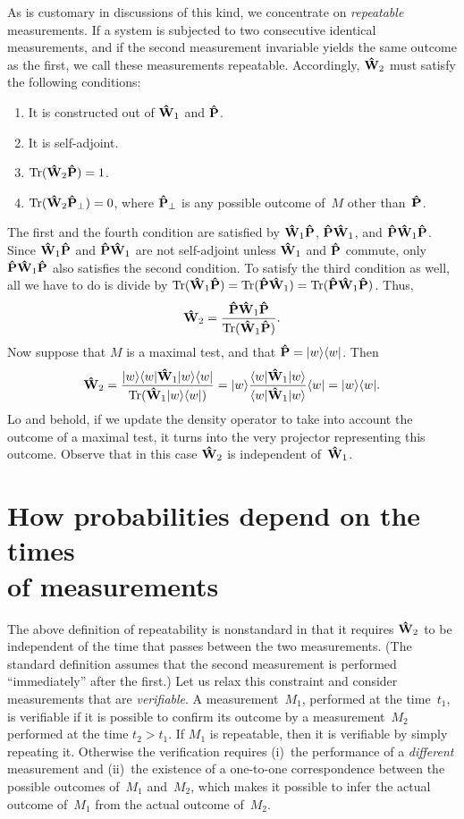 \documentclass[12pt]{article}
\newcommand{\bra}[1]{\langle#1\vert}
\newcommand{\ket}[1]{\vert#1\rangle}
\newcommand{\ketbra}[2]{\vert#1\rangle\langle#2\vert}
\newcommand{\sandwich}[3]{\langle#1\vert#2\vert#3\rangle}
\newcommand{\Tr}{\hbox{Tr}}
\newcommand{\be}{\begin{equation}}
\newcommand{\ee}{\end{equation}}
\newcommand{\ben}{\begin{enumerate}}
\newcommand{\een}{\end{enumerate}}
\newcommand{\hP}{{\bf\hat P}}
\newcommand{\hW}{{\bf\hat W}}
\begin{document}
As is customary in discussions of this kind, we concentrate on \textit{repeatable} measurements. If a system is subjected to two consecutive identical measurements, and if the second measurement invariable yields the same outcome as the first, we call these measurements repeatable. Accordingly, $\hW_2$ must satisfy the following conditions:
\ben
\item It is constructed out of $\hW_1$ and $\hP$.
\item It is self-adjoint.
\item $\Tr(\hW_2\hP)=1$.
\item $\Tr(\hW_2\hP_\perp)=0$, where $\hP_\perp$ is any possible outcome of~$M$ other than~$\hP$.
\een
The first and the fourth condition are satisfied by $\hW_1\hP$, $\hP\hW_1$, and $\hP\hW_1\hP$. Since $\hW_1\hP$ and $\hP\hW_1$ are not self-adjoint unless $\hW_1$ and $\hP$ commute, only $\hP\hW_1\hP$ also satisfies the second condition. To satisfy the third condition as well, all we have to do is divide by $\Tr(\hW_1\hP)=\Tr(\hP\hW_1)=\Tr(\hP\hW_1\hP)$. Thus,
\be
\hW_2=\frac{\hP\hW_1\hP}{\Tr(\hW_1\hP)}.
\ee
Now suppose that $M$ is a maximal test, and that $\hP=\ketbra ww$. Then
\be
\hW_2=\frac{\ketbra ww\hW_1\ketbra ww}{{\rm Tr}(\hW_1\ketbra ww)}=
\ket w\frac{\sandwich w{\hW_1}w}{\sandwich w{\hW_1}w}\bra w=\ketbra ww.
\ee
Lo and behold, if we update the density operator to take into account the outcome of a maximal test, it turns into the very projector representing this outcome. Observe that in this case $\hW_2$ is independent of~$\hW_1$.

\section{How probabilities depend on the times\\
of measurements}
The above definition of repeatability is nonstandard in that it requires $\hW_2$ to be independent of the time that passes between the two measurements. (The standard definition assumes that the second measurement is performed ``immediately'' after the first.) Let us relax this constraint and consider measurements that are \textit{verifiable}. A measurement~$M_1$, performed at the time~$t_1$, is verifiable if it is possible to confirm its outcome by a measurement~$M_2$ performed at the time $t_2>t_1$. If $M_1$ is repeatable, then it is verifiable by simply repeating it. Otherwise the verification requires (i)~the performance of a \textit{different} measurement and (ii)~the existence of a one-to-one correspondence between the possible outcomes of~$M_1$ and~$M_2$, which makes it possible to infer the actual outcome of~$M_1$ from the actual outcome of~$M_2$.
\end{document}
